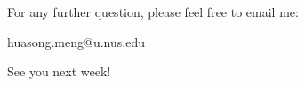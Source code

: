 \begin{comment}
\begin{frame}[fragile]{Second Slide Title} 

\begin{itemize}
\item Avertir Drupal
\end{itemize}
\begin{lstlisting}
ERROR:  relation "copy" does not exist
SQL state: 42P01
\end{lstlisting}

2-b
\begin{lstlisting}
ERROR:  duplicate key value violates unique constraint "book_isbn10_key"
DETAIL:  Key (isbn10)=(0321197844) already exists.
SQL state: 23505
\end{lstlisting}

2-c
\begin{lstlisting}
ERROR:  duplicate key value violates unique constraint "book_pkey"
DETAIL:  Key (isbn13)=(978-0321197849) already exists.
SQL state: 23505
\end{lstlisting}

2-d
\begin{lstlisting}
ERROR:  duplicate key value violates unique constraint "student_pkey"
DETAIL:  Key (email)=(tikki@gmail.com) already exists.
SQL state: 23505
\end{lstlisting}

2-e (extra)
\begin{lstlisting}
ERROR:  null value in column "email" of relation "student" violates not-null constraint
DETAIL:  Failing row contains (RIKKI TAVI , null, 2010-01-01, School of Computing , CS, null).
SQL state: 23502
\end{lstlisting}

2-g
\begin{lstlisting}
ERROR:  update or delete on table "student" violates foreign key constraint "loan_borrower_fkey" on table "loan"
DETAIL:  Key (email)=(xiexin2011@gmail.com) is still referenced from table "loan".
SQL state: 23503
\end{lstlisting}

3-b (case 1: IMMEDIATE)
\begin{lstlisting}
ERROR:  current transaction is aborted, commands ignored until end of transaction block
SQL state: 25P02
\end{lstlisting}

3-b (case 2: DEFFERED)
\begin{lstlisting}
ERROR:  syntax error at or near "DEFERRED"
LINE 1: DEFERRED
^
SQL state: 42601
Character: 1
\end{lstlisting}

2-g
\begin{lstlisting}

\end{lstlisting}
\end{frame}

\end{comment}

\begin{frame}{}
\centering  
For any further question, please feel free to email me:\vspace{10pt}

huasong.meng@u.nus.edu \vspace{20pt}

See you next week!
\end{frame}